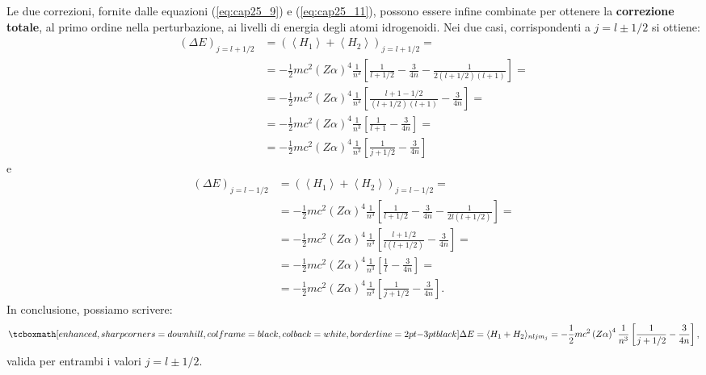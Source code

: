 \documentclass[a4paper,12pt,oneside]{book}
\begin{document}
Le due correzioni, fornite dalle equazioni (\ref{eq:cap25_9}) e (\ref{eq:cap25_11}), possono essere infine combinate per ottenere la \textbf{correzione totale}, al primo ordine nella perturbazione, ai livelli di energia degli atomi idrogenoidi. Nei due casi, corrispondenti a $j=l\pm1/2$ si ottiene:
	\begin{align} 
		\left( \Delta E \right)_{j=l+1/2} &= \left( \left< H_1\right> +\left<H_2 \right>  \right)_{j=l+1/2}= \nonumber \\
		& = -\frac{1}{2} mc^2 \left( Z\alpha \right)^4 \frac{1}{n^3} \left[ \frac{1}{l+1/2}-\frac{3}{4n}-\frac{1}{2(l+1/2)(l+1)}\right]=  \nonumber \\
		& =  -\frac{1}{2} mc^2 \left( Z\alpha \right)^4 \frac{1}{n^3} \left[ \frac{l+1-1/2}{(l+1/2)(l+1)}-\frac{3}{4n}\right]= \nonumber  \\
		& = -\frac{1}{2} mc^2 \left( Z\alpha \right)^4 \frac{1}{n^3} \left[ \frac{1}{l+1}-\frac{3}{4n} \right]= \nonumber \\
		& = -\frac{1}{2} mc^2 \left( Z\alpha \right)^4 \frac{1}{n^3} \left[ \frac{1}{j+1/2}-\frac{3}{4n} \right]
	\end{align}
e
	\begin{align} 
		 \left( \Delta E \right)_{j=l-1/2}&=\left( \left< H_1\right> +\left<H_2 \right>  \right)_{j=l-1/2}= \nonumber \\
		& = -\frac{1}{2} mc^2 \left( Z\alpha \right)^4 \frac{1}{n^3} \left[ \frac{1}{l+1/2}-\frac{3}{4n}-\frac{1}{2l(l+1/2)}\right]= \nonumber \\
		& = -\frac{1}{2} mc^2 \left( Z\alpha \right)^4 \frac{1}{n^3} \left[ \frac{l+1/2}{l(l+1/2)}-\frac{3}{4n}\right]= \nonumber \\
		& = -\frac{1}{2} mc^2 \left( Z\alpha \right)^4 \frac{1}{n^3} \left[ \frac{1}{l}-\frac{3}{4n} \right]= \nonumber  \\
		& = -\frac{1}{2} mc^2 \left( Z\alpha \right)^4 \frac{1}{n^3} \left[ \frac{1}{j+1/2}-\frac{3}{4n} \right] .
	\end{align}
In conclusione, possiamo scrivere:
	\begin{equation}
		\tcboxmath[enhanced, sharp corners=downhill, colframe=black, colback=white, borderline={2pt}{-3pt}{black}]{
			\Delta E = \langle H_1+H_2 \rangle_{nljm_j}= -\frac{1}{2}mc^2 \left( Z\alpha \right)^4 \frac{1}{n^3} \left[ \frac{1}{j+1/2}-\frac{3}{4n}\right] ,
			}
	\end{equation}
valida per entrambi i valori $j=l\pm1/2$. \\
\end{document}
